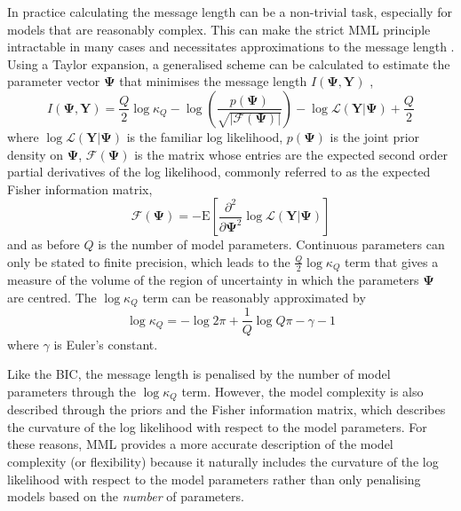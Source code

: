 \documentclass[twocolumn]{aastex62}
\newcommand{\vect}[1]{\boldsymbol{\mathbf{#1}}}
\renewcommand{\vec}[1]{\vect{#1}}
\newcommand{\data}{\textbf{Y}}
\newcommand{\vecdata}{\vec\data}
\newcommand{\likelihood}{\mathcal{L}}
\begin{document}
In practice calculating the message length can be a non-trivial task, 
especially for models that are reasonably complex. This can make the strict MML
principle intractable in many cases and necessitates
approximations to the message length
\citep[however see][]{Wallace:1987,WallaceDowe1999a,Wallace:2005}. Using a Taylor expansion, a generalised
scheme can be calculated to estimate the parameter vector $\vec\Psi$ that
minimises the message length ${I}(\vec\Psi,\vecdata)$ \citep{Wallace:1987},
\begin{equation}
	{I}(\vec\Psi,\vecdata) = \frac{Q}{2}\log\kappa_Q - \log\left(\frac{p(\vec\Psi)}{\sqrt{|\mathcal{F}(\vec\Psi)|}}\right) - \log\mathcal{L}\left(\vecdata|\vec\Psi\right) + \frac{Q}{2} \label{eq:mml} 
\end{equation}
\noindent{}where $\log\likelihood(\vecdata|\vec\Psi)$ is the familiar
log likelihood, $p(\vec\Psi)$ is the joint prior density on $\vec\Psi$,
$\mathcal{F}(\vec\Psi)$ is the matrix whose entries are the expected second order
partial derivatives of the log likelihood,
commonly referred to as the expected Fisher information matrix,
\begin{equation}
	\mathcal{F}(\vec\Psi) = -\textrm{E}\left[\frac{\partial^2}{\partial\vec\Psi^2}\log\likelihood(\vecdata|\vec\Psi)\right]
\end{equation}
\noindent{}and as before $Q$ is the number of model parameters.
Continuous parameters can only be stated to finite precision, which leads
to the $\frac{Q}{2}\log\kappa_Q$ term that gives a measure of the volume of the region of
uncertainty in which the parameters $\vec\Psi$ are centred. The $\log\kappa_Q$
term can be reasonably approximated by
\begin{equation}
	\log\kappa_Q = -\log{2\pi} + \frac{1}{Q}\log{Q\pi} - \gamma - 1
\end{equation}
\noindent{}where $\gamma$ is Euler's constant.

Like the BIC, the message length is penalised by the number of model parameters
through the $\log\kappa_Q$ term. However, the model complexity is also 
described through the priors and the Fisher information matrix, which
describes the curvature of the log likelihood with respect to the model
parameters. For these reasons, MML provides a more accurate description of
the model complexity (or flexibility) because it naturally includes the 
curvature of the log likelihood with respect to the model parameters
rather than only penalising models based on the \emph{number} of
parameters.
\end{document}
